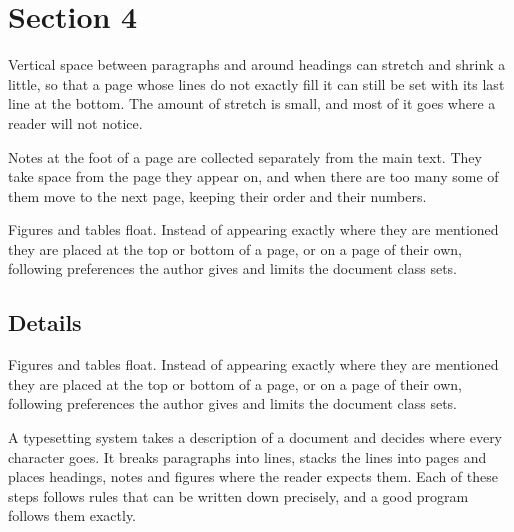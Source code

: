 \documentclass{article}
\begin{document}
\section{Section 4}
Vertical space between paragraphs and around headings can stretch and shrink a little, so that a page whose lines do not exactly fill it can still be set with its last line at the bottom. The amount of stretch is small, and most of it goes where a reader will not notice.

Notes at the foot of a page are collected separately from the main text. They take space from the page they appear on, and when there are too many some of them move to the next page, keeping their order and their numbers.

Figures and tables float. Instead of appearing exactly where they are mentioned they are placed at the top or bottom of a page, or on a page of their own, following preferences the author gives and limits the document class sets.
\subsection{Details}
Figures and tables float. Instead of appearing exactly where they are mentioned they are placed at the top or bottom of a page, or on a page of their own, following preferences the author gives and limits the document class sets.

A typesetting system takes a description of a document and decides where every character goes. It breaks paragraphs into lines, stacks the lines into pages and places headings, notes and figures where the reader expects them. Each of these steps follows rules that can be written down precisely, and a good program follows them exactly.
\end{document}

